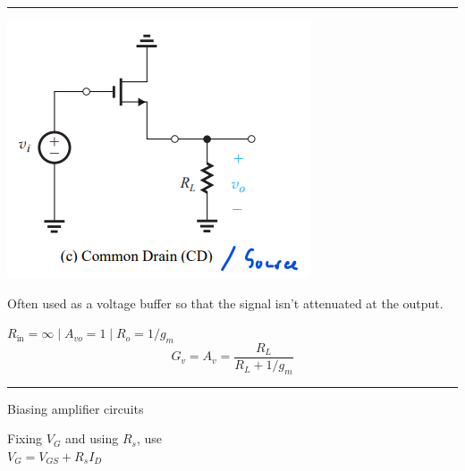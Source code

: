 \documentclass[a4paper]{article}
\begin{document}
\begin{multicols*}{3}
\hrule
\includegraphics[width=0.8\linewidth]{imgs/common_drain.png}

Often used as a voltage buffer so that the signal isn't attenuated
at the output.

$R_\text{in}=\infty \mid A_{vo}=1 \mid R_o=1/g_m$
$$G_v=A_v=\frac{R_L}{R_L+1/g_m}$$

\hrule
\vspace{1mm}
Biasing amplifier circuits

Fixing $V_G$ and using $R_s$, use\\
$V_G=V_{GS}+R_sI_D$

\end{multicols*}
\end{document}
